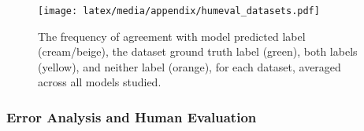 \begin{table*}
    \centering
    \small
    \caption{Accuracy Scores for Classification with Caption-Based Reasoning. The changes in accuracy points (\%) compared to simple classification are shown alongside the actual values for the originally worst-performing models. The highest scores achieved are highlighted in green.}
    \label{tab:exp4_accuracies}
\end{table*}

\begin{figure}[t]
    \centering
    \texttt{[image: latex/media/appendix/humeval\_datasets.pdf]}
    \caption{The frequency of agreement with model predicted label (cream/beige), the dataset ground truth label (green), both labels (yellow), and neither label (orange), for each dataset, averaged across all models studied.}
    \label{fig:humeval_datasets}
\end{figure}

\subsubsection{Error Analysis and Human Evaluation}
\label{app:humeval}


